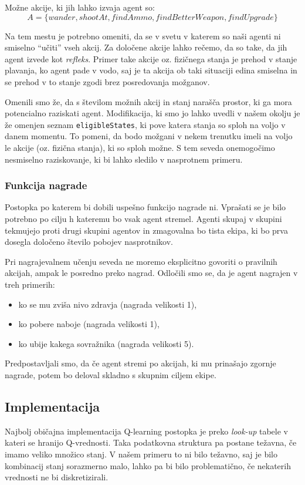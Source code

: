 \documentclass[a4paper,10pt]{article}
\begin{document}
Možne akcije, ki jih lahko izvaja agent so:
$$A = \{wander, shootAt, findAmmo, findBetterWeapon, findUpgrade\}$$

\noindent
Na tem mestu je potrebno omeniti, da se v svetu v katerem so naši agenti ni smiselno ``učiti'' vseh akcij. Za določene akcije lahko rečemo, da so take, da jih agent izvede kot \textit{refleks}. Primer take akcije oz. fizičnega stanja je prehod v stanje plavanja, ko agent pade v vodo, saj je ta akcija ob taki situaciji edina smiselna in se prehod v to stanje zgodi brez posredovanja možganov.

Omenili smo že, da s številom možnih akcij in stanj narašča prostor, ki ga mora potencialno raziskati agent. Modifikacija, ki smo jo lahko uvedli v našem okolju je že omenjen seznam \verb+eligibleStates+, ki pove katera stanja so sploh na voljo v danem momentu. To pomeni, da bodo možgani v nekem trenutku imeli na voljo le akcije (oz. fizična stanja), ki so sploh možne. S tem seveda onemogočimo nesmiselno raziskovanje, ki bi lahko sledilo v nasprotnem primeru.

\subsubsection{Funkcija nagrade}

Postopka po katerem bi dobili uspešno funkcijo nagrade ni. Vprašati se je bilo potrebno po cilju h kateremu bo vsak agent stremel. Agenti skupaj v skupini tekmujejo proti drugi skupini agentov in zmagovalna bo tista ekipa, ki bo prva dosegla določeno število pobojev nasprotnikov.

Pri nagrajevalnem učenju seveda ne moremo eksplicitno govoriti o pravilnih akcijah, ampak le posredno preko nagrad. Odločili smo se, da je agent nagrajen v treh primerih:

\begin{itemize}
 \item ko se mu zviša nivo zdravja (nagrada velikosti 1),
 \item ko pobere naboje (nagrada velikosti 1),
 \item ko ubije kakega sovražnika (nagrada velikosti 5).
\end{itemize}

\noindent
Predpostavljali smo, da če agent stremi po akcijah, ki mu prinašajo zgornje nagrade, potem bo deloval skladno s skupnim ciljem ekipe.

\subsection{Implementacija}
Najbolj običajna implementacija Q-learning postopka je preko \textit{look-up} tabele v kateri se hranijo Q-vrednosti. Taka podatkovna struktura pa postane težavna, če imamo veliko množico stanj. V našem primeru to ni bilo težavno, saj je bilo kombinacij stanj sorazmerno malo, lahko pa bi bilo problematično, če nekaterih vrednosti ne bi diskretizirali.
\end{document}
